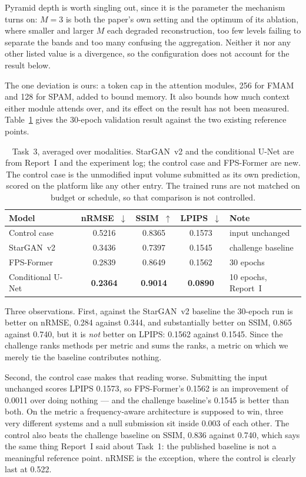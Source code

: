\documentclass[11pt,a4paper]{article}
\newcommand{\rmse}{nRMSE}
\newcommand{\best}[1]{\textbf{#1}}
\newcommand{\reportone}{Report~I}
\begin{document}
Pyramid depth is worth singling out, since it is the parameter the mechanism turns on: $M = 3$ is both
the paper's own setting and the optimum of its ablation, where smaller and larger $M$ each degraded
reconstruction, too few levels failing to separate the bands and too many confusing the aggregation.
Neither it nor any other listed value is a divergence, so the configuration does not account for the
result below.

The one deviation is ours: a token cap in the attention modules, 256 for FMAM and 128 for SPAM, added
to bound memory. It also bounds how much context either module attends over, and its effect on the
result has not been measured. Table~\ref{tab:task3} gives the 30-epoch validation result against the
two existing reference points.

\begin{table}[H]
  \centering
  \small
  \caption{Task~3, averaged over modalities. StarGAN~v2 and the conditional U-Net are from \reportone{}
  and the experiment log; the control case and FPS-Former are new. The control case is the unmodified
  input volume submitted as its own prediction, scored on the platform like any other entry. The
  trained runs are not matched on budget or schedule, so that comparison is not controlled.}
  \label{tab:task3}
  \begin{tabular}{lcccl}
    \toprule
    Model & \rmse{}~$\downarrow$ & SSIM~$\uparrow$ & LPIPS~$\downarrow$ & Note \\
    \midrule
    Control case & 0.5216 & 0.8365 & 0.1573 & input unchanged \\
    StarGAN~v2 & 0.3436 & 0.7397 & 0.1545 & challenge baseline \\
    FPS-Former & 0.2839 & 0.8649 & 0.1562 & 30 epochs \\
    Conditional U-Net & \best{0.2364} & \best{0.9014} & \best{0.0890} & 10 epochs, \reportone{} \\
    \bottomrule
  \end{tabular}
\end{table}

Three observations. First, against the StarGAN~v2 baseline the 30-epoch run is better on \rmse{},
\num{0.284} against \num{0.344}, and substantially better on SSIM, \num{0.865} against \num{0.740}, but
it is \emph{not} better on LPIPS: \num{0.1562} against \num{0.1545}. Since the challenge ranks methods
per metric and sums the ranks, a metric on which we merely tie the baseline contributes nothing.

Second, the control case makes that reading worse. Submitting the input unchanged scores LPIPS
\num{0.1573}, so FPS-Former's \num{0.1562} is an improvement of \num{0.0011} over doing nothing --- and
the challenge baseline's \num{0.1545} is better than both. On the metric a frequency-aware
architecture is supposed to win, three very different systems and a null submission sit inside
\num{0.003} of each other. The control also beats the challenge baseline on SSIM, \num{0.836} against
\num{0.740}, which says the same thing \reportone{} said about Task~1: the published baseline is not a
meaningful reference point. \rmse{} is the exception, where the control is clearly last at
\num{0.522}.
\end{document}
